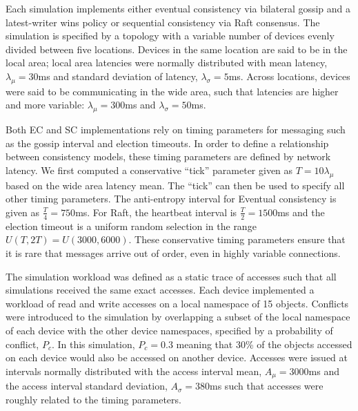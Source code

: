 \documentclass{article}
\begin{document}
Each simulation implements either eventual consistency via bilateral gossip and a latest-writer wins policy or sequential consistency via Raft consensus. The simulation is specified by a topology with a variable number of devices evenly divided between five locations. Devices in the same location are said to be in the local area; local area latencies were normally distributed with mean latency, $\lambda_{\mu}=30$ms and standard deviation of latency, $\lambda_{\sigma}=5$ms. Across locations, devices were said to be communicating in the wide area, such that latencies are higher and more variable: $\lambda_{\mu}=300$ms and $\lambda_{\sigma}=50$ms.

Both EC and SC implementations rely on timing parameters for messaging such as the gossip interval and election timeouts. In order to define a relationship between consistency models, these timing parameters are defined by network latency. We first computed a conservative ``tick'' parameter given as $T=10\lambda_{\mu}$ based on the wide area latency mean. The ``tick'' can then be used to specify all other timing parameters. The anti-entropy interval for Eventual consistency is given as $\frac {T} {4} = 750$ms. For Raft, the heartbeat interval is $\frac {T} {2} = 1500$ms and the election timeout is a uniform random selection in the range $U(T, 2T) = U(3000, 6000)$. These conservative timing parameters ensure that it is rare that messages arrive out of order, even in highly variable connections.

The simulation workload was defined as a static trace of accesses such that all simulations received the same exact accesses. Each device implemented a workload of read and write accesses on a local namespace of 15 objects. Conflicts were introduced to the simulation by overlapping a subset of the local namespace of each device with the other device namespaces, specified by a probability of conflict, $P_c$. In this simulation, $P_c=0.3$ meaning that 30\% of the objects accessed on each device would also be accessed on another device. Accesses were issued at intervals normally distributed with the access interval mean, $A_{\mu}=3000$ms and the access interval standard deviation, $A_{\sigma}=380$ms such that accesses were roughly related to the timing parameters.
\end{document}
